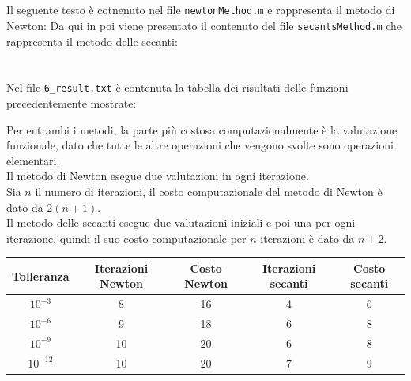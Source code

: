 \documentclass[10pt,a4paper]{article}
\begin{document}
\section{}
Il seguente testo è cotnenuto nel file \texttt{newtonMethod.m} e rappresenta il metodo di Newton:
Da qui in poi viene presentato il contenuto del file \texttt{secantsMethod.m} che rappresenta il metodo delle secanti:\\


\section{}
Nel file \texttt{6\_result.txt} è contenuta la tabella dei risultati delle funzioni precedentemente mostrate:

Per entrambi i metodi, la parte più costosa computazionalmente è la valutazione funzionale, dato che tutte le altre operazioni che vengono svolte sono operazioni elementari.\\
Il metodo di Newton esegue due valutazioni in ogni iterazione.\\
Sia $n$ il numero di iterazioni, il costo computazionale del metodo di Newton è dato da $2(n+1)$.\\
Il metodo delle secanti esegue due valutazioni iniziali e poi una per ogni iterazione, quindi il suo costo computazionale per $n$ iterazioni è dato da $n+2$.
\begin{center}
\begin{tabular}{|c c c c c|} 
 \hline
 Tolleranza & Iterazioni Newton & Costo Newton & Iterazioni secanti & Costo secanti\\ [0.5ex] 
 \hline
 $10^{-3}$ & 8 & 16 & 4 & 6 \\ 
 \hline
 $10^{-6}$ & 9 & 18 & 6 & 8 \\
 \hline
 $10^{-9}$ & 10 & 20 & 6 & 8 \\
 \hline
 $10^{-12}$ & 10 & 20 & 7 & 9 \\
 \hline
\end{tabular}
\end{center}
\pagebreak
\end{document}
